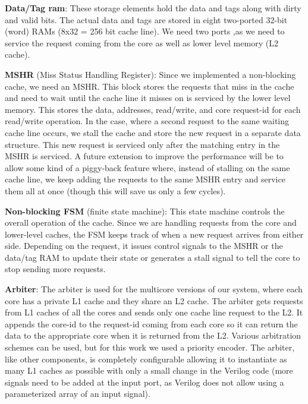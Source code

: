 
\textbf{Data/Tag ram}: These storage elements hold the data and tags along with dirty and valid bits. The actual data and tags are stored in eight two-ported 32-bit (word) RAMs (8x32 = 256 bit cache line). We need two ports ,as we need to service the request coming from the core as well as lower level memory (L2 cache). 

\textbf{MSHR} (Miss Status Handling Register): Since we implemented a non-blocking cache, we need an MSHR. This block stores the requests that miss in the cache and need to wait until the cache line it misses on is serviced by the lower level memory. This stores the data, addresses, read/write, and core request-id for each read/write operation. In the case, where a second request to the same waiting cache line occurs, we stall the cache and store the new request in a separate data structure. This new request is serviced only after the matching entry in the MSHR is serviced. A future extension to improve the performance will be to allow some kind of a piggy-back feature where, instead of stalling on the same cache line, we keep adding the requests to the same MSHR entry and service them all at once (though this will save us only a few cycles).

\textbf{Non-blocking FSM} (finite state machine): This state machine controls the overall operation of the cache. Since we are handling requests from the core and lower-level caches, the FSM keeps track of when a new request arrives from either side. Depending on the request, it issues control signals to the MSHR or the data/tag RAM to update their state or generates a stall signal to tell the core to stop sending more requests.

\textbf{Arbiter}: The arbiter is used for the multicore versions of our system, where each core has a private L1 cache and they share an L2 cache. The arbiter gets requests from L1 caches of all the cores and sends only one cache line request to the L2. It appends the core-id to the request-id coming from each core so it can return the data to the appropriate core when it is returned from the L2. Various arbitration schemes can be used, but for this work we used a priority encoder. The arbiter, like other components, is completely configurable allowing it to instantiate as many L1 caches as possible with only a small change in the Verilog code (more signals need to be added at the input port, as Verilog does not allow using a parameterized array of an input signal). %

